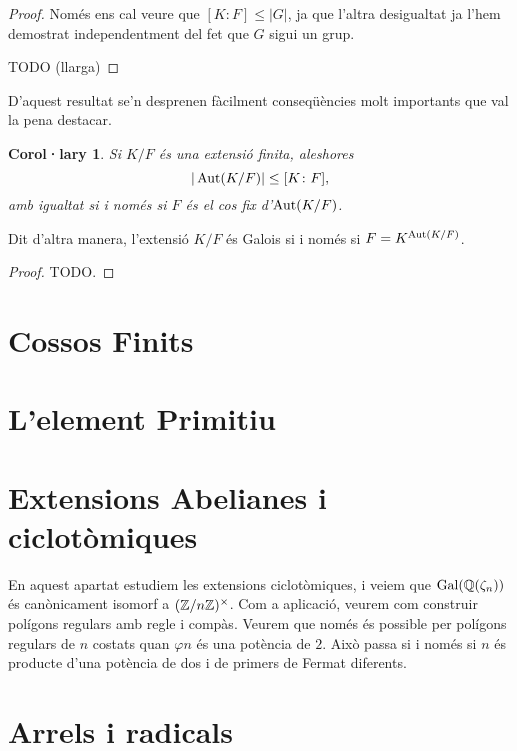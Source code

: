 \documentclass[
]{book}
\newtheorem{corollary}{Corol·lary}[chapter]
\theoremstyle{definition}
\theoremstyle{definition}
\theoremstyle{definition}
\theoremstyle{definition}
\theoremstyle{remark}
\begin{document}
\begin{proof}
Només ens cal veure que \([K\colon F] \leq |G|\), ja que l'altra desigualtat ja l'hem demostrat independentment
del fet que \(G\) sigui un grup.

TODO (llarga)
\end{proof}

D'aquest resultat se'n desprenen fàcilment conseqüències molt importants que val la pena destacar.

\begin{corollary}
Si \(K/F\) és una extensió finita, aleshores
\[
|\operatorname{Aut}(K/F)| \leq [K\colon F],
\]
amb igualtat si i només si \(F\) és el cos fix d'\(\operatorname{Aut}(K/F)\).
\end{corollary}

Dit d'altra manera, l'extensió \(K/F\) és Galois si i només si \(F=K^{\operatorname{Aut}(K/F)}\).

\begin{proof}
TODO.
\end{proof}

\hypertarget{cossos-finits}{%
\chapter{Cossos Finits}\label{cossos-finits}}

\hypertarget{lelement-primitiu}{%
\chapter{L'element Primitiu}\label{lelement-primitiu}}

\hypertarget{extensions-abelianes-i-ciclotuxf2miques}{%
\chapter{Extensions Abelianes i ciclotòmiques}\label{extensions-abelianes-i-ciclotuxf2miques}}

En aquest apartat estudiem les extensions ciclotòmiques, i veiem que \(\operatorname{Gal}(\mathbb{Q}(\zeta_n))\)
és canònicament isomorf a \((\mathbb{Z}/n\mathbb{Z})^\times\). Com a aplicació, veurem com construir
polígons regulars amb regle i compàs. Veurem que només és possible per polígons regulars
de \(n\) costats quan \(\varphi{n}\) és una potència de \(2\). Això passa si i només si \(n\) és producte
d'una potència de dos i de primers de Fermat diferents.

\hypertarget{arrels-i-radicals}{%
\chapter{Arrels i radicals}\label{arrels-i-radicals}}
\end{document}
